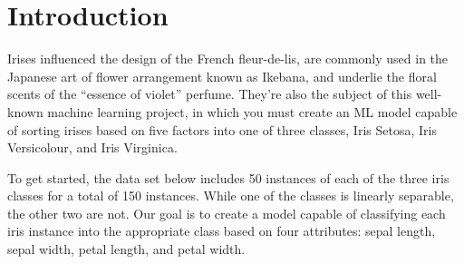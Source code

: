 \documentclass[a4paper]{article}
\begin{document}

\newpage
	\tableofcontents
\newpage

\section{Introduction}
Irises influenced the design of the French fleur-de-lis, are commonly used in the Japanese art of flower arrangement known as Ikebana, and underlie the floral scents of the “essence of violet” perfume. They’re also the subject of this well-known machine learning project, in which you must create an ML model capable of sorting irises based on five factors into one of three classes, Iris Setosa, Iris Versicolour, and Iris Virginica.

To get started, the data set below includes 50 instances of each of the three iris classes for a total of 150 instances. While one of the classes is linearly separable, the other two are not. Our goal is to create a model capable of classifying each iris instance into the appropriate class based on four attributes: sepal length, sepal width, petal length, and petal width. 
\end{document}
